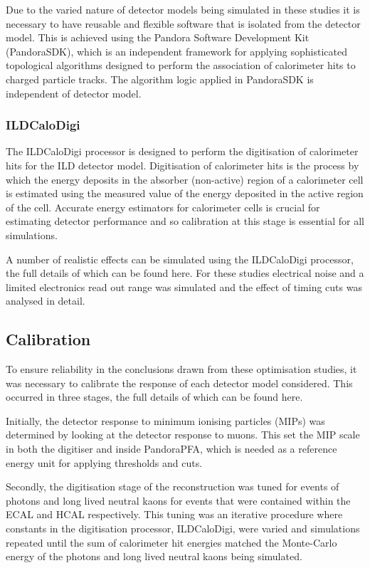 \documentclass[final,3p,times,twocolumn]{elsarticle}
\begin{document}
Due to the varied nature of detector models being simulated in these studies it is necessary to have reusable and flexible software that is isolated from the detector model.  This is achieved using the Pandora Software Development Kit (PandoraSDK), which is an independent framework for applying sophisticated topological algorithms designed to perform the association of calorimeter hits to charged particle tracks.  The algorithm logic applied in PandoraSDK is independent of detector model.

\subsubsection{ILDCaloDigi}

The ILDCaloDigi processor is designed to perform the digitisation of calorimeter hits for the ILD detector model.  Digitisation of calorimeter hits is the process by which the energy deposits in the absorber (non-active) region of a calorimeter cell is estimated using the measured value of the energy deposited in the active region of the cell.  Accurate energy estimators for calorimeter cells is crucial for estimating detector performance and so calibration at this stage is essential for all simulations.  

A number of realistic effects can be simulated using the ILDCaloDigi processor, the full details of which can be found here.  For these studies electrical noise and a limited electronics read out range was simulated and the effect of timing cuts was analysed in detail.

\subsection{Calibration}

To ensure reliability in the conclusions drawn from these optimisation studies, it was necessary to calibrate the response of each detector model considered.  This occurred in three stages, the full details of which can be found here.  

Initially, the detector response to minimum ionising particles (MIPs) was determined by looking at the detector response to muons.  This set the MIP scale in both the digitiser and inside PandoraPFA, which is needed as a reference energy unit for applying thresholds and cuts.  

Secondly, the digitisation stage of the reconstruction was tuned for events of photons and long lived neutral kaons for events that were contained within the ECAL and HCAL respectively.  This tuning was an iterative procedure where constants in the digitisation processor, ILDCaloDigi, were varied and simulations repeated until the sum of calorimeter hit energies matched the Monte-Carlo energy of the photons and long lived neutral kaons being simulated.
\end{document}
